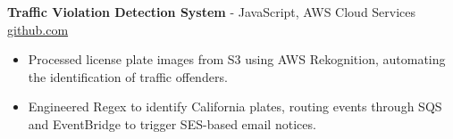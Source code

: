 \documentclass[11pt]{article}       %
\begin{document}

\textbf{Traffic Violation Detection System}{ - JavaScript, AWS Cloud Services} \hfill \href{https://github.com/Monica20030707/AWS_rekonigition-N-read-database}{github.com} \\
\vspace{-9pt}
\begin{itemize}
  \item Processed license plate images from S3 using AWS Rekognition, automating the identification of traffic offenders.
  \item Engineered Regex to identify California plates, routing events through SQS and EventBridge to trigger SES-based email notices.
\end{itemize}

\end{document}
